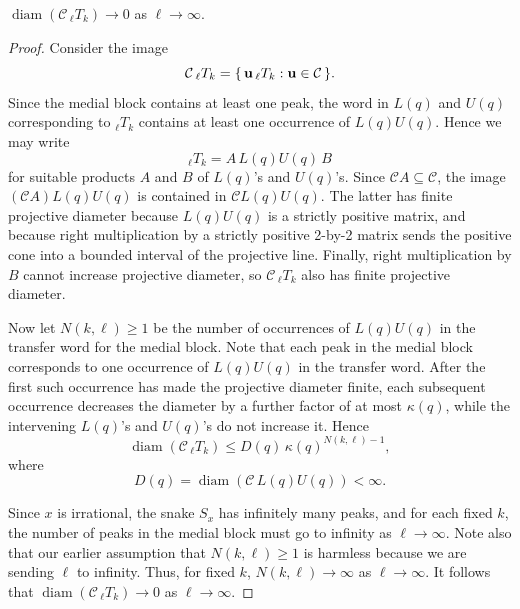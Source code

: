 \documentclass[10pt,a4paper]{amsart}
\begin{document}
\begin{lemma}
$\operatorname{diam}(\mathcal C\,{}_{\ell}T_k) \rightarrow 0$
as $\ell\rightarrow\infty$.
\end{lemma}

\begin{proof}
Consider the image \[ \mathcal C\,{}_{\ell}T_k = 
\{\,{\bf u}\,{}_{\ell}T_k:{\bf u}\in\mathcal C\,\}.  \]
Since the medial block contains at least one peak,
the word in $L(q)$ and $U(q)$ corresponding to ${}_{\ell}T_k$
contains at least one occurrence of $L(q)U(q)$.
Hence we may write \[ {}_{\ell}T_k=A\,L(q)U(q)\,B \]
for suitable products $A$ and $B$ of $L(q)$'s and $U(q)$'s.
Since $\mathcal C A\subseteq\mathcal C$,
the image $(\mathcal C A)L(q)U(q)$ is contained in
$\mathcal C L(q)U(q)$.
The latter has finite projective diameter because
$L(q)U(q)$ is a strictly positive matrix,
and because right multiplication by a strictly positive 2-by-2 matrix 
sends the positive cone into a bounded interval of the projective line.
Finally, right multiplication by $B$ cannot increase projective diameter,
so $\mathcal C\,{}_{\ell}T_k$ also has finite projective diameter.

Now let $N(k,\ell) \geq 1$ be the number of occurrences 
of $L(q)U(q)$ in the transfer word for the medial block.
Note that each peak in the medial block corresponds
to one occurrence of $L(q)U(q)$ in the transfer word.
After the first such occurrence has made the projective diameter finite,
each subsequent occurrence decreases the diameter by a further factor
of at most $\kappa(q)$, while the intervening $L(q)$'s and $U(q)$'s do not
increase it. Hence
\[ \operatorname{diam}(\mathcal C\,{}_{\ell}T_k) \le
D(q)\,\kappa(q)^{N(k,\ell)-1}, \]
where
\[ D(q)=\operatorname{diam}(\mathcal C\,L(q)U(q))<\infty .  \]

Since $x$ is irrational, the snake $S_x$ has infinitely many peaks,
and for each fixed $k$, the number of peaks in the medial block
must go to infinity as $\ell \rightarrow \infty$.
Note also that our earlier assumption that $N(k,\ell) \geq 1$
is harmless because we are sending $\ell$ to infinity.
Thus, for fixed $k$, $N(k,\ell)\rightarrow\infty$
as $\ell\rightarrow\infty$. It follows that
$\operatorname{diam}(\mathcal C\,{}_{\ell}T_k) \rightarrow 0$
as $\ell\rightarrow\infty$.
\end{proof}
\end{document}
